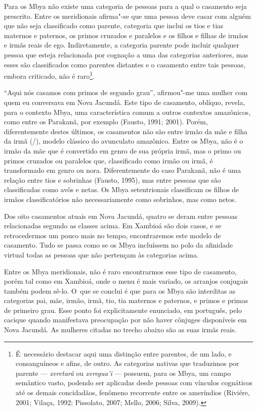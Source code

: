 Para os Mbya não existe uma categoria de pessoas para a qual o casamento
seja prescrito. Entre os meridionais afirma"-se que uma pessoa deve
casar com alguém que não seja classificado como parente, categoria que
inclui os tios e tias maternos e paternos, os primos cruzados e
paralelos e os filhos e filhas de irmãos e irmãs reais de ego.
Indiretamente, a categoria parente pode incluir qualquer pessoa que
esteja relacionada por cognação a uma das categorias anteriores, mas
esses são classificados como parentes distantes e o casamento entre
tais pessoas, embora criticado, não é raro\footnote{É~necessário
destacar aqui uma distinção entre parentes, de um lado, e consanguíneos
e afins, de outro. As categorias nativas que traduzimos por parente ---
\emph{xeretarã} ou \emph{xeregua’i} --- possuem, para os Mbya, um campo semântico
vasto, podendo ser aplicadas desde pessoas com vínculos cognáticos até
os demais concidadãos, fenômeno recorrente entre os ameríndios
(Riviére, 2001; Vilaça, 1992; Pissolato, 2007; Mello, 2006; Silva,
2009).}. 

``Aqui nós casamos com primos de segundo grau'', afirmou"-me uma mulher com
quem eu conversava em Nova Jacundá. Este tipo de casamento, oblíquo,
revela, para o contexto Mbya, uma característica comum a outros
contextos amazônicos, como entre os Parakanã, por exemplo (Fausto,
1991; 2001). Porém, diferentemente destes últimos, os casamentos não
são entre irmão da mãe e filha da irmã (/), modelo clássico do
avunculato amazônico. Entre os Mbya, não é o irmão da mãe que é
convertido em genro de sua própria irmã, mas o primo ou primos cruzados
ou paralelos que, classificado como irmão ou irmã, é transformado em
genro ou nora. Diferentemente do caso Parakanã, não é uma relação entre
tios e sobrinhas (Fausto, 1995), mas entre pessoas que são
classificadas como avôs e netas. Os Mbya setentrionais classificam os
filhos de irmãos classificatórios não necessariamente como sobrinhos,
mas como netos.

Dos oito casamentos atuais em Nova Jacundá, quatro se deram entre
pessoas relacionadas segundo as classes acima. Em Xambioá são dois
casos, e se retrocedermos um pouco mais no tempo, encontraremos este
modelo de casamento. Tudo se passa como se os Mbya incluíssem no polo
da afinidade virtual todas as pessoas que não pertençam às categorias
acima.

Entre os Mbya meridionais, não é raro encontrarmos esse tipo de
casamento, porém tal como em Xambioá, onde o menu é mais variado, os
arranjos conjugais também podem sê-lo. O~que se conclui é que para os
Mbya são interditas as categorias pai, mãe, irmão, irmã, tio, tia
maternos e paternos, e primos e primas de primeiro grau. Esse ponto foi
explicitamente enunciado, em português, pelo cacique quando manifestava
preocupação por não haver cônjuges disponíveis em Nova Jacundá. As
mulheres citadas no trecho abaixo são as suas irmãs reais.

